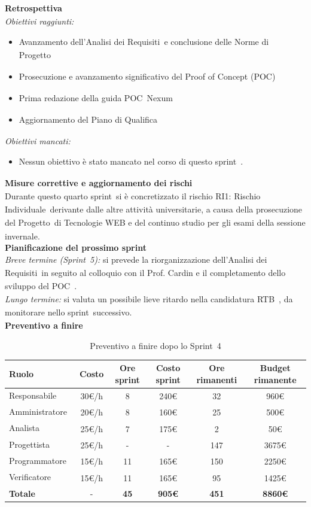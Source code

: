\documentclass[a4paper,12pt]{article}
\newcommand{\pediceG}{\texorpdfstring{\textsubscript{\scalebox{0.6}{\textbf{G}}}~}{G}}
\begin{document}
\noindent\textbf{Retrospettiva\pediceG}\\
\textit{Obiettivi raggiunti:}
\begin{itemize}
    \item Avanzamento dell'Analisi dei Requisiti\pediceG e conclusione delle Norme di Progetto\pediceG
    \item Prosecuzione e avanzamento significativo del Proof of Concept (POC)\pediceG
    \item Prima redazione della guida POC\pediceG Nexum
    \item Aggiornamento del Piano di Qualifica\pediceG
\end{itemize}
\textit{Obiettivi mancati:}
\begin{itemize}
    \item Nessun obiettivo è stato mancato nel corso di questo sprint\pediceG.
\end{itemize}

\noindent\textbf{Misure correttive e aggiornamento dei rischi\pediceG}\\
Durante questo quarto sprint\pediceG si è concretizzato il rischio RI1: Rischio Individuale\pediceG derivante dalle altre attività universitarie, a causa della prosecuzione del Progetto\pediceG di Tecnologie WEB e del continuo studio per gli esami della sessione invernale.\\

\noindent\textbf{Pianificazione del prossimo sprint}\\
\textit{Breve termine (Sprint\pediceG 5):} si prevede la riorganizzazione dell'Analisi dei Requisiti\pediceG in seguito al colloquio con il Prof. Cardin e il completamento dello sviluppo del POC\pediceG.\\

\textit{Lungo termine:} si valuta un possibile lieve ritardo nella candidatura RTB\pediceG, da monitorare nello sprint\pediceG successivo.\\

\noindent\textbf{Preventivo a finire}

\begin{table}[H]
\centering
\footnotesize
\begin{tabular}{|l|c|c|c|c|c|}
\hline
Ruolo & Costo & Ore sprint & Costo sprint & Ore rimanenti & Budget rimanente \\
\hline
Responsabile\pediceG & 30€/h & 8 & 240€ & 32 & 960€ \\
\hline
Amministratore\pediceG & 20€/h & 8 & 160€ & 25 & 500€ \\
\hline
Analista\pediceG & 25€/h & 7 & 175€ & 2 & 50€ \\
\hline
Progettista\pediceG & 25€/h & - & - & 147 & 3675€ \\
\hline
Programmatore\pediceG & 15€/h & 11 & 165€ & 150 & 2250€ \\
\hline
Verificatore\pediceG & 15€/h & 11 & 165€ & 95 & 1425€ \\
\hline
\textbf{Totale} & - & \textbf{45} & \textbf{905€} & \textbf{451} & \textbf{8860€} \\
\hline
\end{tabular}
\caption{Preventivo a finire dopo lo Sprint\pediceG 4}
\label{tab:risorse-sprint4}
\end{table}
\end{document}
